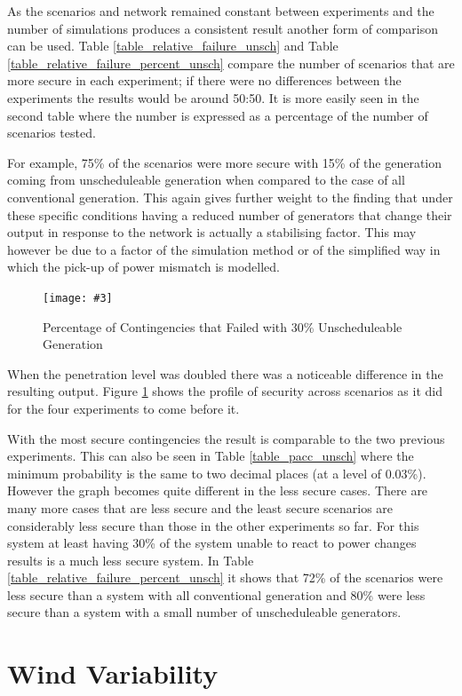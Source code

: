 \documentclass[a4paper,oneside,12pt]{report}
\newcommand{\image}[3] {
  \begin{figure}
    \begin{center}
      \texttt{[image: \#3]}
      \caption{#2}
      \label{#1}
    \end{center}
  \end{figure}
}
\begin{document}
As the scenarios and network remained constant between experiments and the number of simulations produces a consistent result another form of comparison can be used. Table \ref{table_relative_failure_unsch} and Table \ref{table_relative_failure_percent_unsch} compare the number of scenarios that are more secure in each experiment; if there were no differences between the experiments the results would be around 50:50. It is more easily seen in the second table where the number is expressed as a percentage of the number of scenarios tested. 

For example, 75\% of the scenarios were more secure with 15\% of the generation coming from unscheduleable generation when compared to the case of all conventional generation. This again gives further weight to the finding that under these specific conditions having a reduced number of generators that change their output in response to the network is actually a stabilising factor. This may however be due to a factor of the simulation method or of the simplified way in which the pick-up of power mismatch is modelled. 

\image{pacc-unsch30}{Percentage of Contingencies that Failed with 30\% Unscheduleable Generation}{pacc-unsch30.png}

When the penetration level was doubled there was a noticeable difference in the resulting output. Figure \ref{pacc-unsch30} shows the profile of security across scenarios as it did for the four experiments to come before it. 

With the most secure contingencies the result is comparable to the two previous experiments. This can also be seen in Table \ref{table_pacc_unsch} where the minimum probability is the same to two decimal places (at a level of 0.03\%). However the graph becomes quite different in the less secure cases. There are many more cases that are less secure and the least secure scenarios are considerably less secure than those in the other experiments so far. For this system at least having 30\% of the system unable to react to power changes results is a much less secure system. In Table \ref{table_relative_failure_percent_unsch} it shows that 72\% of the scenarios were less secure than a system with all conventional generation and 80\% were less secure than a system with a small number of unscheduleable generators.

\clearpage

\section{Wind Variability}
\end{document}
